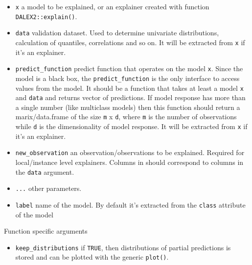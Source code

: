 \documentclass[]{krantz}
\providecommand{\tightlist}{%
  \setlength{\itemsep}{0pt}\setlength{\parskip}{0pt}}
\theoremstyle{definition}
\theoremstyle{definition}
\theoremstyle{definition}
\theoremstyle{remark}
\begin{document}
\begin{itemize}
\tightlist
\item
  \texttt{x} a model to be explained, or an explainer created with
  function \texttt{DALEX2::explain()}.
\item
  \texttt{data} validation dataset. Used to determine univariate
  distributions, calculation of quantiles, correlations and so on. It
  will be extracted from \texttt{x} if it's an explainer.
\item
  \texttt{predict\_function} predict function that operates on the model
  \texttt{x}. Since the model is a black box, the
  \texttt{predict\_function} is the only interface to access values from
  the model. It should be a function that takes at least a model
  \texttt{x} and \texttt{data} and returns vector of predictions. If
  model response has more than a single number (like multiclass models)
  then this function should return a marix/data.frame of the size
  \texttt{m} x \texttt{d}, where \texttt{m} is the number of
  observations while \texttt{d} is the dimensionality of model response.
  It will be extracted from \texttt{x} if it's an explainer.
\item
  \texttt{new\_observation} an observation/observations to be explained.
  Required for local/instance level explainers. Columns in should
  correspond to columns in the \texttt{data} argument.
\item
  \texttt{...} other parameters.
\item
  \texttt{label} name of the model. By default it's extracted from the
  \texttt{class} attribute of the model
\end{itemize}

Function specific arguments

\begin{itemize}
\tightlist
\item
  \texttt{keep\_distributions} if \texttt{TRUE}, then distributions of
  partial predictions is stored and can be plotted with the generic
  \texttt{plot()}.
\end{itemize}


\end{document}
